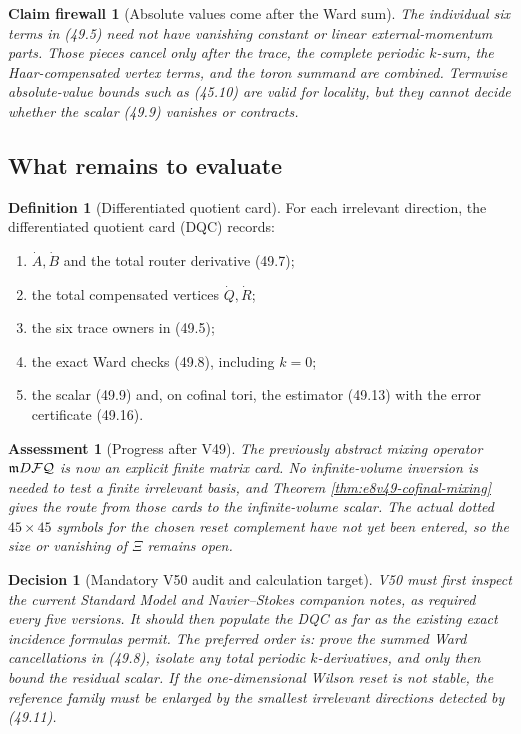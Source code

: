 \documentclass[11pt,oneside]{book}
\newtheorem{assessment}[theorem]{Assessment}
\newtheorem{firewall}[theorem]{Claim firewall}
\newtheorem{decision}[theorem]{Decision}
\theoremstyle{definition}
\newtheorem{definition}[theorem]{Definition}
\theoremstyle{remark}
\begin{document}
\begin{firewall}[Absolute values come after the Ward sum]
\label{fire:e8v49-sum-first}
The individual six terms in (49.5) need not have vanishing
constant or linear external-momentum parts.  Those pieces cancel
only after the trace, the complete periodic \(k\)-sum, the
Haar-compensated vertex terms, and the toron summand are combined.
Termwise absolute-value bounds such as (45.10) are valid for
locality, but they cannot decide whether the scalar (49.9)
vanishes or contracts.
\end{firewall}

\subsection{What remains to evaluate}

\begin{definition}[Differentiated quotient card]
\label{def:e8v49-DQC}
For each irrelevant direction, the differentiated quotient card
(DQC) records:
\begin{enumerate}
\item \(\dot A,\dot B\) and the total router derivative (49.7);
\item the total compensated vertices \(\dot Q,\dot R\);
\item the six trace owners in (49.5);
\item the exact Ward checks (49.8), including \(k=0\);
\item the scalar (49.9) and, on cofinal tori, the estimator
      (49.13) with the error certificate (49.16).
\end{enumerate}
\end{definition}

\begin{assessment}[Progress after V49]
\label{ass:e8v49-status}
The previously abstract mixing operator
\({\mathfrak m}D{\cal F}{\cal Q}\) is now an explicit finite
matrix card.  No infinite-volume inversion is needed to test a
finite irrelevant basis, and Theorem
\ref{thm:e8v49-cofinal-mixing} gives the route from those cards to
the infinite-volume scalar.  The actual dotted \(45\times45\)
symbols for the chosen reset complement have not yet been entered,
so the size or vanishing of \(\Xi\) remains open.
\end{assessment}

\begin{decision}[Mandatory V50 audit and calculation target]
\label{dec:e8v49-next}
V50 must first inspect the current Standard Model and
Navier--Stokes companion notes, as required every five versions.
It should then populate the DQC as far as the existing exact
incidence formulas permit.  The preferred order is: prove the
summed Ward cancellations in (49.8), isolate any total periodic
\(k\)-derivatives, and only then bound the residual scalar.  If the
one-dimensional Wilson reset is not stable, the reference family
must be enlarged by the smallest irrelevant directions detected by
(49.11).
\end{decision}
\end{document}
